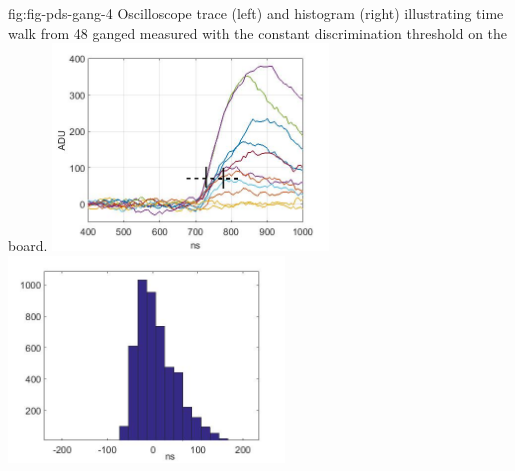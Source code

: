 \begin{dunefigure}
 {fig:fig-pds-gang-4}
 {Oscilloscope trace (left) and histogram (right) illustrating time walk from 48 ganged  measured with the constant discrimination threshold on the  board.}
\includegraphics[height=5.5cm]{graphics/pds-gang-time-walk.jpg}
\includegraphics[height=5.5cm]{graphics/pds-gang-time-walk-hist.jpg}
\end{dunefigure}




